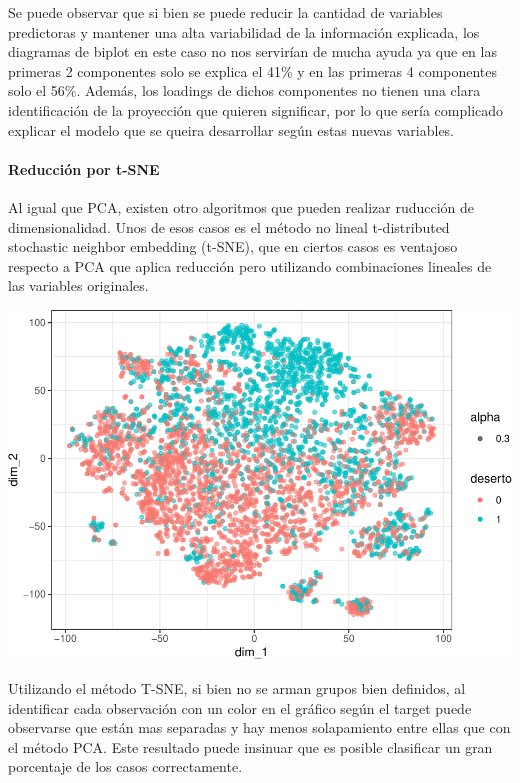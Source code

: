 \documentclass[]{article}
\let\oldparagraph\paragraph
\renewcommand{\paragraph}[1]{\oldparagraph{#1}\mbox{}}
\begin{document}
Se puede observar que si bien se puede reducir la cantidad de variables
predictoras y mantener una alta variabilidad de la información
explicada, los diagramas de biplot en este caso no nos servirían de
mucha ayuda ya que en las primeras 2 componentes solo se explica el 41\%
y en las primeras 4 componentes solo el 56\%. Además, los loadings de
dichos componentes no tienen una clara identificación de la proyección
que quieren significar, por lo que sería complicado explicar el modelo
que se queira desarrollar según estas nuevas variables.

\hypertarget{reducciuxf3n-por-t-sne}{%
\paragraph{Reducción por t-SNE}\label{reducciuxf3n-por-t-sne}}

Al igual que PCA, existen otro algoritmos que pueden realizar ruducción
de dimensionalidad. Unos de esos casos es el método no lineal
t-distributed stochastic neighbor embedding (t-SNE), que en ciertos
casos es ventajoso respecto a PCA que aplica reducción pero utilizando
combinaciones lineales de las variables originales.

\includegraphics{00_pca_tsne_cluster_files/figure-latex/unnamed-chunk-11-1.pdf}

Utilizando el método T-SNE, si bien no se arman grupos bien definidos,
al identificar cada observación con un color en el gráfico según el
target puede observarse que están mas separadas y hay menos solapamiento
entre ellas que con el método PCA. Este resultado puede insinuar que es
posible clasificar un gran porcentaje de los casos correctamente.
\end{document}
